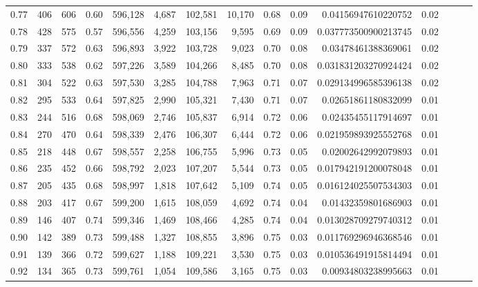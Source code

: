 \begin{tabular}{rrrrrrrrrrrrrrr}
0.77 &     406 &    606 &  0.60 &  596,128 &    4,687 &  102,581 &   10,170 &  0.68 &  0.09 &    0.04156947610220752 &      0.02 \\
0.78 &     428 &    575 &  0.57 &  596,556 &    4,259 &  103,156 &    9,595 &  0.69 &  0.09 &   0.037773500900213745 &      0.02 \\
0.79 &     337 &    572 &  0.63 &  596,893 &    3,922 &  103,728 &    9,023 &  0.70 &  0.08 &    0.03478461388369061 &      0.02 \\
0.80 &     333 &    538 &  0.62 &  597,226 &    3,589 &  104,266 &    8,485 &  0.70 &  0.08 &   0.031831203270924424 &      0.02 \\
0.81 &     304 &    522 &  0.63 &  597,530 &    3,285 &  104,788 &    7,963 &  0.71 &  0.07 &   0.029134996585396138 &      0.02 \\
0.82 &     295 &    533 &  0.64 &  597,825 &    2,990 &  105,321 &    7,430 &  0.71 &  0.07 &    0.02651861180832099 &      0.01 \\
0.83 &     244 &    516 &  0.68 &  598,069 &    2,746 &  105,837 &    6,914 &  0.72 &  0.06 &    0.02435455117914697 &      0.01 \\
0.84 &     270 &    470 &  0.64 &  598,339 &    2,476 &  106,307 &    6,444 &  0.72 &  0.06 &   0.021959893925552768 &      0.01 \\
0.85 &     218 &    448 &  0.67 &  598,557 &    2,258 &  106,755 &    5,996 &  0.73 &  0.05 &    0.02002642992079893 &      0.01 \\
0.86 &     235 &    452 &  0.66 &  598,792 &    2,023 &  107,207 &    5,544 &  0.73 &  0.05 &   0.017942191200078048 &      0.01 \\
0.87 &     205 &    435 &  0.68 &  598,997 &    1,818 &  107,642 &    5,109 &  0.74 &  0.05 &   0.016124025507534303 &      0.01 \\
0.88 &     203 &    417 &  0.67 &  599,200 &    1,615 &  108,059 &    4,692 &  0.74 &  0.04 &    0.01432359801686903 &      0.01 \\
0.89 &     146 &    407 &  0.74 &  599,346 &    1,469 &  108,466 &    4,285 &  0.74 &  0.04 &   0.013028709279740312 &      0.01 \\
0.90 &     142 &    389 &  0.73 &  599,488 &    1,327 &  108,855 &    3,896 &  0.75 &  0.03 &   0.011769296946368546 &      0.01 \\
0.91 &     139 &    366 &  0.72 &  599,627 &    1,188 &  109,221 &    3,530 &  0.75 &  0.03 &   0.010536491915814494 &      0.01 \\
0.92 &     134 &    365 &  0.73 &  599,761 &    1,054 &  109,586 &    3,165 &  0.75 &  0.03 &    0.00934803238995663 &      0.01 \\

\end{tabular}

